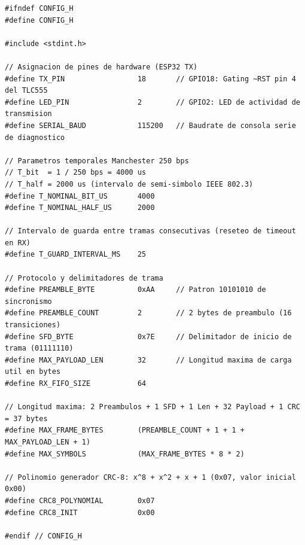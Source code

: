 \begin{lstlisting}[style=customcpp, caption={Configuración general del transmisor (\texttt{firmware\_tx/config.h})}]
#ifndef CONFIG_H
#define CONFIG_H

#include <stdint.h>

// Asignacion de pines de hardware (ESP32 TX)
#define TX_PIN                 18       // GPIO18: Gating ~RST pin 4 del TLC555
#define LED_PIN                2        // GPIO2: LED de actividad de transmision
#define SERIAL_BAUD            115200   // Baudrate de consola serie de diagnostico

// Parametros temporales Manchester 250 bps
// T_bit  = 1 / 250 bps = 4000 us
// T_half = 2000 us (intervalo de semi-simbolo IEEE 802.3)
#define T_NOMINAL_BIT_US       4000
#define T_NOMINAL_HALF_US      2000

// Intervalo de guarda entre tramas consecutivas (reseteo de timeout en RX)
#define T_GUARD_INTERVAL_MS    25

// Protocolo y delimitadores de trama
#define PREAMBLE_BYTE          0xAA     // Patron 10101010 de sincronismo
#define PREAMBLE_COUNT         2        // 2 bytes de preambulo (16 transiciones)
#define SFD_BYTE               0x7E     // Delimitador de inicio de trama (01111110)
#define MAX_PAYLOAD_LEN        32       // Longitud maxima de carga util en bytes
#define RX_FIFO_SIZE           64

// Longitud maxima: 2 Preambulos + 1 SFD + 1 Len + 32 Payload + 1 CRC = 37 bytes
#define MAX_FRAME_BYTES        (PREAMBLE_COUNT + 1 + 1 + MAX_PAYLOAD_LEN + 1)
#define MAX_SYMBOLS            (MAX_FRAME_BYTES * 8 * 2)

// Polinomio generador CRC-8: x^8 + x^2 + x + 1 (0x07, valor inicial 0x00)
#define CRC8_POLYNOMIAL        0x07
#define CRC8_INIT              0x00

#endif // CONFIG_H
\end{lstlisting}

